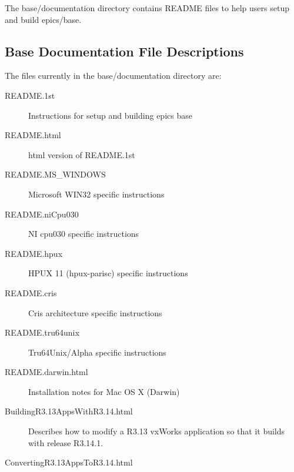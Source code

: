 The base/documentation directory contains README files to help users setup and build epics/base.

\subsection{Base Documentation File Descriptions}

The files currently in the base/documentation directory are:

\begin{description}

\item[README.1st]

Instructions for setup and building epics base

\item[README.html]

html version of README.1st

\item[README.MS\_WINDOWS]

Microsoft WIN32 specific instructions

\item[README.niCpu030]

NI cpu030 specific instructions

\item[README.hpux]

HPUX 11 (hpux-parisc) specific instructions

\item[README.cris]

Cris architecture specific instructions

\item[README.tru64unix]

Tru64Unix/Alpha specific instructions

\item[README.darwin.html]

Installation notes for Mac OS X (Darwin)

\item[BuildingR3.13AppsWithR3.14.html]

Describes how to modify a R3.13 vxWorks application so that it builds with release R3.14.1.

\item[ConvertingR3.13AppsToR3.14.html]


\end{description}
